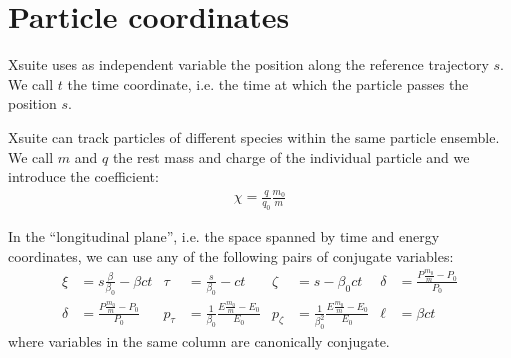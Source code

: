 \section{Particle coordinates}

Xsuite uses as independent variable the position along the reference trajectory $s$.
We call $t$ the time coordinate, i.e. the time at which the particle passes
the position $s$.

Xsuite can track particles of different species within the same particle ensemble.
We call $m$ and $q$ the rest mass and charge of the individual particle and we introduce
the coefficient:
\begin{align}
  \chi = \frac{q}{q_0} \frac{m_0}{m}
\end{align}

In the ``longitudinal plane'', i.e. the space spanned by time and energy coordinates,
we can use any of the following pairs of conjugate variables:
\begin{align}
\xi &= s \frac{\beta}{\beta_0} - \beta c t &
\tau &= \frac{s}{\beta_0} - ct &
\zeta &= s - \beta_0 ct \label{eq:coord1}&
\delta &=
  \frac{P \frac{m_0}{m} -P_0}{P_0} \\
\delta &=
  \frac{P \frac{m_0}{m} -P_0}{P_0} &
p_\tau &=
  \frac{1}{\beta_0} \frac{E \frac{m_0}{m} -E_0}{E_0} &
p_\zeta &=
  \frac{1}{\beta_0^2}\frac{E \frac{m_0}{m} -E_0}{E_0}&
\ell &= \beta c t
  \label{eq:coord2}
\end{align}
where variables in the same column are canonically conjugate.

